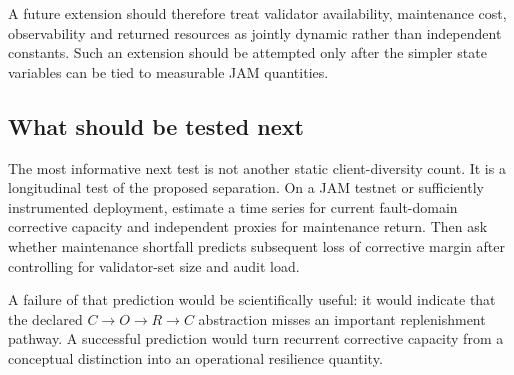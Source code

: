 A future extension should therefore treat validator availability, maintenance cost, observability and returned resources as jointly dynamic rather than independent constants. Such an extension should be attempted only after the simpler state variables can be tied to measurable JAM quantities.

\subsection{What should be tested next}

The most informative next test is not another static client-diversity count. It is a longitudinal test of the proposed separation. On a JAM testnet or sufficiently instrumented deployment, estimate a time series for current fault-domain corrective capacity and independent proxies for maintenance return. Then ask whether maintenance shortfall predicts subsequent loss of corrective margin after controlling for validator-set size and audit load.

A failure of that prediction would be scientifically useful: it would indicate that the declared $C\!\to O\!\to R\!\to C$ abstraction misses an important replenishment pathway. A successful prediction would turn recurrent corrective capacity from a conceptual distinction into an operational resilience quantity.

